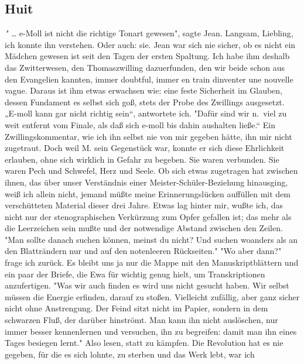 \documentclass[
]{article}
\author{}
\date{\vspace{-2.5em}}
\begin{document}
\subsection{Huit}\label{huit}

\emph{" \ldots{} }e-Moll ist nicht die richtige Tonart gewesen", sagte
Jean. Langsam, Liebling, ich konnte ihn verstehen. Oder auch: sie. Jean
war sich nie sicher, ob es nicht ein Mädchen gewesen ist seit den Tagen
der ersten Spaltung. Ich habe ihm deshalb das Zwitterwesen, den
Thomaszwilling dazuerfunden, den wir beide schon aus den Evangelien
kannten, immer doubtful, immer en train d\textquotesingle inventer une
nouvelle vague. Daraus ist ihm etwas erwachsen wie: eine feste
Sicherheit im Glauben, dessen Fundament es selbst sich goß, stets der
Probe des Zwillings ausgesetzt.\\
„E-moll kann gar nicht richtig sein``, antwortete ich. "Dafür sind wir
n.~viel zu weit entfernt vom Finale, als daß sich e-moll bis dahin
aushalten ließe.`` Ein Zwillingskommentar, wie ich ihn selbst nie von
mir gegeben hätte, ihn mir nicht zugetraut. Doch weil M. sein Gegenstück
war, konnte er sich diese Ehrlichkeit erlauben, ohne sich wirklich in
Gefahr zu begeben. Sie waren verbunden. Sie waren Pech und Schwefel,
Herz und Seele. Ob sich etwas zugetragen hat zwischen ihnen, das über
unser Verständnis einer Meister-Schüler-Beziehung hinausging, weiß ich
allein nicht, jemand müßte meine Erinnerungslücken auffüllen mit dem
verschütteten Material dieser drei Jahre. Etwas lag hinter mir, wußte
ich, das nicht nur der stenographischen Verkürzung zum Opfer gefallen
ist; das mehr als die Leerzeichen sein mußte und der notwendige Abstand
zwischen den Zeilen.\\
"Man sollte danach suchen können, meinst du nicht? Und suchen woanders
als an den Blatträndern nur und auf den notenleeren Rückseiten." "Wo
aber dann?" frage ich zurück. Es bleibt uns ja nur die Mappe mit den
Manuskriptblättern und ein paar der Briefe, die Ewa für wichtig genug
hielt, um Transkriptionen anzufertigen. "Was wir auch finden es wird uns
nicht gesucht haben. Wir selbst müssen die Energie erfinden, darauf zu
stoßen. Vielleicht zufällig, aber ganz sicher nicht ohne Anstrengung.
Der Feind sitzt nicht im Papier, sondern in dem schwarzen Fluß, der
darüber hinströmt. Man kann ihn nicht auslöschen, nur immer besser
kennenlernen und versuchen, ihn zu begreifen: damit man ihn eines Tages
besiegen lernt." Also lesen, statt zu kämpfen. Die Revolution hat es nie
gegeben, für die es sich lohnte, zu sterben und das Werk lebt, war ich
\end{document}
